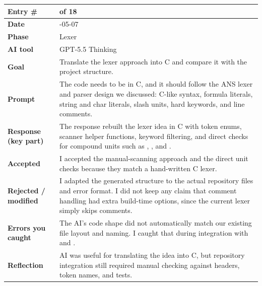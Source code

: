 \documentclass[11pt,a4paper]{article}
\newcommand{\code}[1]{\texttt{\detokenize{#1}}}
\newcommand{\entrygap}{\vspace{8pt}}
\newenvironment{journalentry}{%
  \begin{center}\small\renewcommand{\arraystretch}{1.22}%
  \begin{tabular}{|>{\columncolor{anscodebg}\bfseries}p{3.0cm}|>{\RaggedRight\arraybackslash}p{12.25cm}|}%
  \hline
}{%
  \end{tabular}\end{center}\entrygap
}
\begin{document}
\begin{journalentry}
Entry \# & 10 of 18 \\ \hline
Date & 2026-05-07 \\ \hline
Phase & Lexer \\ \hline
AI tool & GPT-5.5 Thinking \\ \hline
Goal & Translate the lexer approach into C and compare it with the project structure. \\ \hline
Prompt & The code needs to be in C, and it should follow the ANS lexer and parser design we discussed: C-like syntax, formula literals, string and char literals, slash units, hard keywords, and line comments. \\ \hline
Response (key part) & The response rebuilt the lexer idea in C with token enums, scanner helper functions, keyword filtering, and direct checks for compound units such as \code{kg/mol}, \code{kJ/mol}, and \code{g/mol}. \\ \hline
Accepted & I accepted the manual-scanning approach and the direct unit checks because they match a hand-written C lexer. \\ \hline
Rejected / modified & I adapted the generated structure to the actual repository files and error format. I did not keep any claim that comment handling had extra build-time options, since the current lexer simply skips \code{//} comments. \\ \hline
Errors you caught & The AI's code shape did not automatically match our existing file layout and naming. I caught that during integration with \code{D2/include} and \code{D2/src}. \\ \hline
Reflection & AI was useful for translating the idea into C, but repository integration still required manual checking against headers, token names, and tests. \\ \hline
\end{journalentry}
\end{document}
